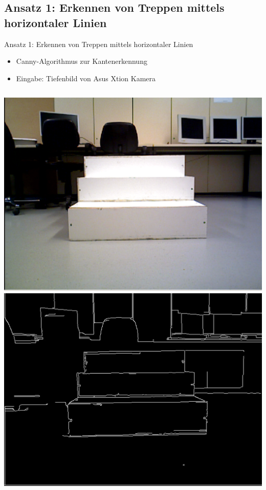 \documentclass[18pt]{beamer}
\begin{document}
\subsection{Ansatz 1: Erkennen von Treppen mittels horizontaler Linien }
\begin{frame}{Ansatz 1: Erkennen von Treppen mittels horizontaler Linien}
	\begin{itemize}
		\item Canny-Algorithmus zur Kantenerkennung
		\item Eingabe: Tiefenbild von Asus Xtion Kamera
	\end{itemize}
	\begin{columns}
		\includegraphics[scale=0.16]{images/canny00.pdf}\newline
		\includegraphics[scale=0.16]{images/canny02.pdf}

\end{columns}
\end{frame}
\end{document}
